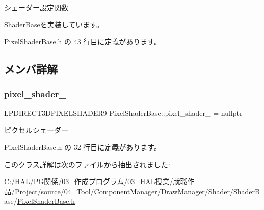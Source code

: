 シェーダー設定関数 



\mbox{\hyperlink{class_shader_base_af45063254b80602db8626360d643baee}{Shader\+Base}}を実装しています。



 Pixel\+Shader\+Base.\+h の 43 行目に定義があります。



\subsection{メンバ詳解}
\mbox{\label{class_pixel_shader_base_a5d7213c21268dc57ef82d37a64ff942f}} 
\subsubsection{\texorpdfstring{pixel\+\_\+shader\+\_\+}{pixel\_shader\_}}
{\footnotesize\ttfamily L\+P\+D\+I\+R\+E\+C\+T3\+D\+P\+I\+X\+E\+L\+S\+H\+A\+D\+E\+R9 Pixel\+Shader\+Base\+::pixel\+\_\+shader\+\_\+ = nullptr\hspace{0.3cm}{\ttfamily [private]}}



ピクセルシェーダー 



 Pixel\+Shader\+Base.\+h の 32 行目に定義があります。



このクラス詳解は次のファイルから抽出されました\+:\begin{DoxyCompactItemize}
\item 
C\+:/\+H\+A\+L/\+P\+G関係/03\+\_\+作成プログラム/03\+\_\+\+H\+A\+L授業/就職作品/\+Project/source/04\+\_\+\+Tool/\+Component\+Manager/\+Draw\+Manager/\+Shader/\+Shader\+Base/\mbox{\hyperlink{_pixel_shader_base_8h}{Pixel\+Shader\+Base.\+h}}\end{DoxyCompactItemize}
